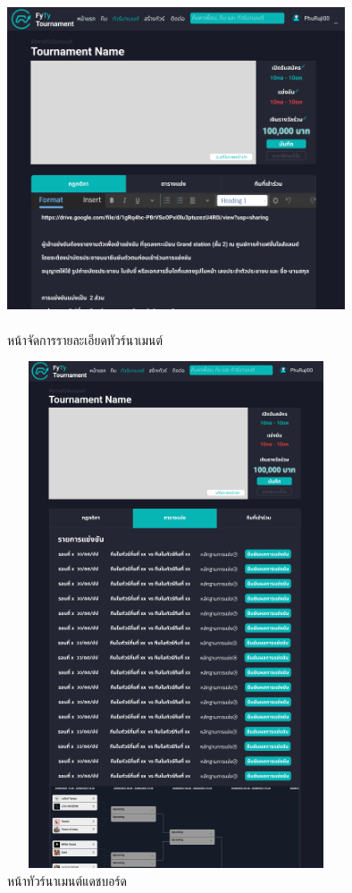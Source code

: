 \begin{figure}[h]
  \begin{center}
  \includegraphics[width=10cm,height=10cm,keepaspectratio]{createDetail.png}
  \end{center}
  \caption[หน้าจัดการรายละเอียดทัวร์นาเมนต์]{หน้าจัดการรายละเอียดทัวร์นาเมนต์}
  \label{fig:หน้าจัดการรายละเอียดทัวร์นาเมนต์}
\end{figure}

\begin{figure}[h]
  \begin{center}
  \includegraphics[width=10cm,height=15cm,keepaspectratio]{dashbordTour.png}
  \end{center}
  \caption[หน้าทัวร์นาเมนต์แดชบอร์ด]{หน้าทัวร์นาเมนต์แดชบอร์ด}
  \label{fig:หน้าทัวร์นาเมนต์แดชบอร์ด}
\end{figure}
